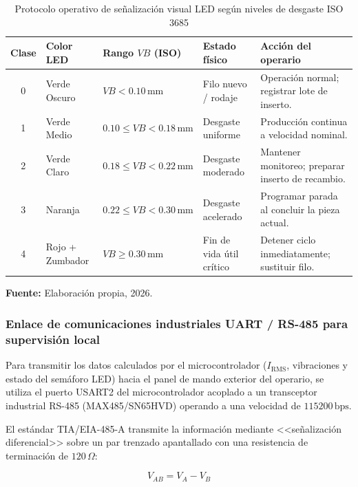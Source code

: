 \begin{table}[H]
\centering
\caption{Protocolo operativo de señalización visual LED según niveles de desgaste ISO 3685}\label{tab:protocolo_semaforo_led}
\vspace{2mm}
\small
\begin{tabular}{cp{2.0cm}p{2.3cm}p{3.0cm}p{4.0cm}}
\hline
\textbf{Clase} & \textbf{Color LED} & \textbf{Rango $VB$ (ISO)} & \textbf{Estado físico} & \textbf{Acción del operario} \\ \hline \hline
0 & Verde Oscuro & $VB < 0.10\,\text{mm}$ & Filo nuevo / rodaje & Operación normal; registrar lote de inserto. \\ \hline
1 & Verde Medio & $0.10 \le VB < 0.18\,\text{mm}$ & Desgaste uniforme & Producción continua a velocidad nominal. \\ \hline
2 & Verde Claro & $0.18 \le VB < 0.22\,\text{mm}$ & Desgaste moderado & Mantener monitoreo; preparar inserto de recambio. \\ \hline
3 & Naranja & $0.22 \le VB < 0.30\,\text{mm}$ & Desgaste acelerado & Programar parada al concluir la pieza actual. \\ \hline
4 & Rojo + Zumbador & $VB \ge 0.30\,\text{mm}$ & Fin de vida útil crítico & Detener ciclo inmediatamente; sustituir filo. \\ \hline
\end{tabular}
\par\vspace{2mm}
\footnotesize \textbf{Fuente:} Elaboración propia, 2026.
\end{table}


\subsubsection{Enlace de comunicaciones industriales UART / RS-485 para supervisión local}

Para transmitir los datos calculados por el microcontrolador ($I_{\text{RMS}}$, vibraciones y estado del semáforo LED) hacia el panel de mando exterior del operario, se utiliza el puerto USART2 del microcontrolador acoplado a un transceptor industrial RS-485 (MAX485/SN65HVD) operando a una velocidad de $115200\,\text{bps}$.

El estándar TIA/EIA-485-A transmite la información mediante <<señalización diferencial>> sobre un par trenzado apantallado con una resistencia de terminación de $120\,\Omega$:

\begin{equation}
V_{AB} = V_A - V_B
\label{eq:tension_diferencial}
\end{equation}

